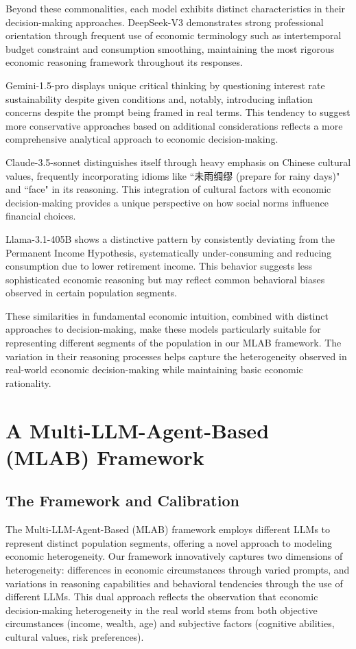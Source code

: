 \documentclass[12pt]{article}
\begin{document}
\begin{CJK*}{UTF8}{gbsn}
Beyond these commonalities, each model exhibits distinct characteristics in their decision-making approaches. DeepSeek-V3 demonstrates strong professional orientation through frequent use of economic terminology such as intertemporal budget constraint and consumption smoothing, maintaining the most rigorous economic reasoning framework throughout its responses. 

Gemini-1.5-pro displays unique critical thinking by questioning interest rate sustainability despite given conditions and, notably, introducing inflation concerns despite the prompt being framed in real terms. This tendency to suggest more conservative approaches based on additional considerations reflects a more comprehensive analytical approach to economic decision-making.

Claude-3.5-sonnet distinguishes itself through heavy emphasis on Chinese cultural values, frequently incorporating idioms like ``未雨绸缪  (prepare for rainy days)" and ``face" in its reasoning. This integration of cultural factors with economic decision-making provides a unique perspective on how social norms influence financial choices.

Llama-3.1-405B shows a distinctive pattern by consistently deviating from the Permanent Income Hypothesis, systematically under-consuming and reducing consumption due to lower retirement income. This behavior suggests less sophisticated economic reasoning but may reflect common behavioral biases observed in certain population segments.

These similarities in fundamental economic intuition, combined with distinct approaches to decision-making, make these models particularly suitable for representing different segments of the population in our MLAB framework. The variation in their reasoning processes helps capture the heterogeneity observed in real-world economic decision-making while maintaining basic economic rationality.

\section{A Multi-LLM-Agent-Based (MLAB) Framework}

\subsection{The Framework and Calibration}

The Multi-LLM-Agent-Based (MLAB) framework employs different LLMs to represent distinct population segments, offering a novel approach to modeling economic heterogeneity. Our framework innovatively captures two dimensions of heterogeneity: differences in economic circumstances through varied prompts, and variations in reasoning capabilities and behavioral tendencies through the use of different LLMs. This dual approach reflects the observation that economic decision-making heterogeneity in the real world stems from both objective circumstances (income, wealth, age) and subjective factors (cognitive abilities, cultural values, risk preferences).


\end{CJK*}
\end{document}
